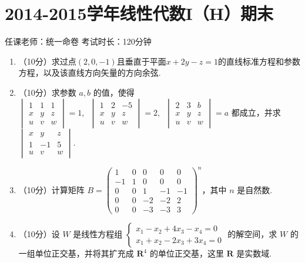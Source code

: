 \section{2014-2015学年线性代数I（H）期末}

\begin{center}
    任课老师：统一命卷\hspace{4em} 考试时长：120分钟
\end{center}

\begin{enumerate}
    \item （10分）求过点$(2,0,-1)$且垂直于平面$x+2y-z=1$的直线标准方程和参数方程，以及该直线方向矢量的方向余弦.

    \item （10分）求参数 $a, b$  的值，使得 $\begin{vmatrix}1 & 1 & 1 \\ x & y & z \\u & v & w\end{vmatrix}=1,\enspace \begin{vmatrix}1 & 2 & -5 \\ x & y & z \\u & v & w\end{vmatrix}=2,\enspace \begin{vmatrix}2 & 3 & b \\ x & y & z \\u & v & w\end{vmatrix}=a$ 都成立，并求$\begin{vmatrix}x & y & z \\ 1 & -1 & 5 \\u & v & w\end{vmatrix}$.

    \item （10分）计算矩阵 $B=\begin{pmatrix}1 & 0 & 0 & 0 & 0 \\ -1 & 1 & 0 & 0 & 0 \\ 0 & 0 & 1 & -1 & -1 \\ 0 & 0 & -2 & -2 & 2 \\ 0 & 0 & -3 & -3 & 3\end{pmatrix}^n$，其中 $n$ 是自然数.

    \item （10分）设 $W$ 是线性方程组 $\begin{cases}
        x_1-x_2+4x_3-x_4=0 \\ x_1+x_2-2x_3+3x_4=0
    \end{cases}$ 的解空间，求 $W$ 的一组单位正交基，并将其扩充成 $\mathbf{R}^4$ 的单位正交基，这里 $\mathbf{R}$ 是实数域.


\end{enumerate}
